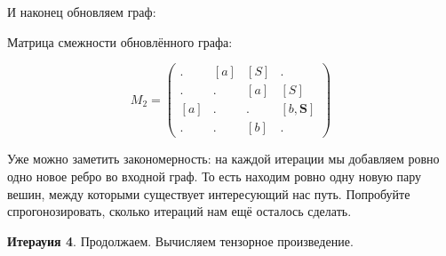 \begin{example}
И наконец обновляем граф:
\begin{center}
\end{center}

Матрица смежности обновлённого графа:

$$ M_2 =
\begin{pmatrix} 
. & [a] & [S] & . \\
. & . & [a] & [S] \\
[a] & . & . & [b, \textbf{S}] \\
. & . & [b] & . 
\end{pmatrix}
$$

Уже можно заметить закономерность: на каждой итерации мы добавляем ровно одно новое ребро во входной граф.
То есть находим ровно одну новую пару вешин, между которыми существует интересующий нас путь.
Попробуйте спрогонозировать, сколько итераций нам ещё осталось сделать.

\textbf{Итерауия 4}.
Продолжаем. Вычисляем тензорное произведение.


\end{example}
